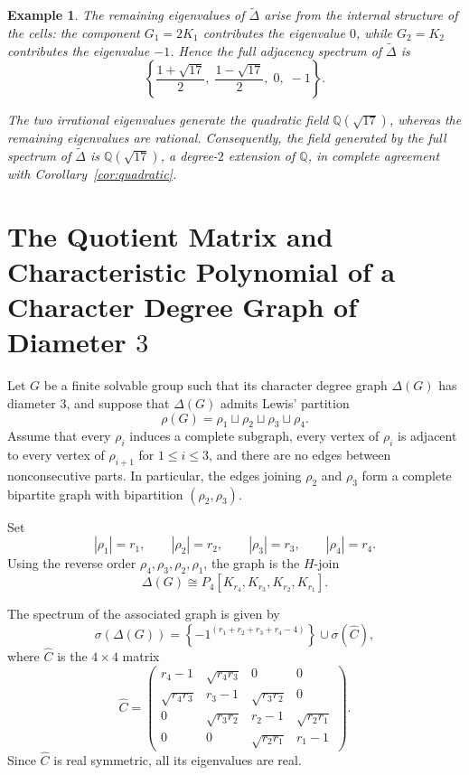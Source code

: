 \documentclass[11pt]{amsart}
\newtheorem{exam}[thm]{\bf Example}
\begin{document}
\begin{exam}
The remaining eigenvalues of $\widetilde{\Delta}$ arise from the internal structure of the cells: the component $G_1 = 2K_1$ contributes the eigenvalue $0$, while $G_2 = K_2$ contributes the eigenvalue $-1$. Hence the full adjacency spectrum of $\widetilde{\Delta}$ is
\[
\left\{ \frac{1+\sqrt{17}}{2},\; \frac{1-\sqrt{17}}{2},\; 0,\; -1 \right\}.
\]

The two irrational eigenvalues generate the quadratic field $\mathbb{Q}(\sqrt{17})$, whereas the remaining eigenvalues are rational. Consequently, the field generated by the full spectrum of $\widetilde{\Delta}$ is $\mathbb{Q}(\sqrt{17})$, a degree-$2$ extension of $\mathbb{Q}$, in complete agreement with Corollary~\ref{cor:quadratic}.
\end{exam}


\section{The Quotient Matrix and Characteristic Polynomial of a Character Degree Graph of Diameter \(3\)}
\label{sec:quotient-matrix}


Let \(G\) be a finite solvable group such that its character degree graph \(\Delta(G)\) has diameter \(3\), and suppose that \(\Delta(G)\) admits Lewis' partition
\[
\rho(G)=\rho_1\sqcup\rho_2\sqcup\rho_3\sqcup\rho_4.
\]
Assume that every \(\rho_i\) induces a complete subgraph, every vertex of \(\rho_i\) is adjacent to every vertex of \(\rho_{i+1}\) for \(1\leq i\leq 3\), and there are no edges between nonconsecutive parts. In particular, the edges joining \(\rho_2\) and \(\rho_3\) form a complete bipartite graph with bipartition \((\rho_2,\rho_3)\).

Set
\[
|\rho_1|=r_1,\qquad |\rho_2|=r_2,\qquad |\rho_3|=r_3,\qquad |\rho_4|=r_4.
\]
Using the reverse order \(\rho_4,\rho_3,\rho_2,\rho_1\), the graph is the
\(H\)-join
\[
\Delta(G)
\cong
P_4[K_{r_4},K_{r_3},K_{r_2},K_{r_1}].
\]

The spectrum of the associated graph is given by
\[
\sigma(\Delta(G))
=
\left\{-1^{(r_1+r_2+r_3+r_4-4)}\right\}
\cup
\sigma(\widehat C),
\]
where \(\widehat C\) is the \(4\times4\) matrix
\[
\widehat C=
\begin{pmatrix}
r_4-1 & \sqrt{r_4r_3} & 0 & 0\\
\sqrt{r_4r_3} & r_3-1 & \sqrt{r_3r_2} & 0\\
0 & \sqrt{r_3r_2} & r_2-1 & \sqrt{r_2r_1}\\
0 & 0 & \sqrt{r_2r_1} & r_1-1
\end{pmatrix}.
\]
Since \(\widehat C\) is real symmetric, all its eigenvalues are real.
\end{document}
